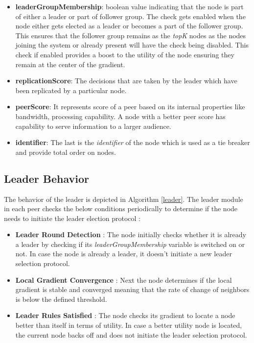 \documentclass[a4paper,11pt]{kth-mag}
\begin{document}
\begin{itemize}

\item \textbf{leaderGroupMembership}: boolean value indicating that the node is part of either a leader or part of follower group.  The check gets enabled when the node either gets elected as a leader or becomes a part of the follower group. This ensures that the follower group remains as the \textit{topK} nodes as the nodes joining the system or already present will have the check being disabled. This check if enabled provides a boost to the utility of the node ensuring they remain at the center of the gradient.

\item \textbf{replicationScore}: The decisions that are taken by the leader which have been replicated by a particular node.

\item \textbf{peerScore}: It represents score of a peer based on its internal properties like bandwidth, processing capability. A node with a better peer score has capability to serve information to a larger audience.

\item \textbf{identifier}: The last is the \textit{identifier} of the node which is used as a tie breaker and provide total order on nodes.

\end{itemize}


\subsection{Leader Behavior}

The behavior of the leader is depicted in Algorithm \ref{leader}. The leader module in each peer checks the below conditions periodically to determine if the node needs to initiate the leader election protocol :

\begin{itemize}

\item \textbf{Leader Round Detection} : The node initially checks whether it is already a leader by checking if its \textit{leaderGroupMembership} variable is switched on or not. In case the node is already a leader, it doesn't initiate a new leader selection protocol.

\item \textbf{Local Gradient Convergence} : Next the node determines if the local gradient is stable and converged meaning that the rate of change of neighbors is below the defined threshold.

\item \textbf{Leader Rules Satisfied} : The node checks its gradient to locate a node better than itself in terms of utility. In case a better utility node is located, the current node backs off and does not initiate the leader selection protocol.

\end{itemize}
\end{document}
